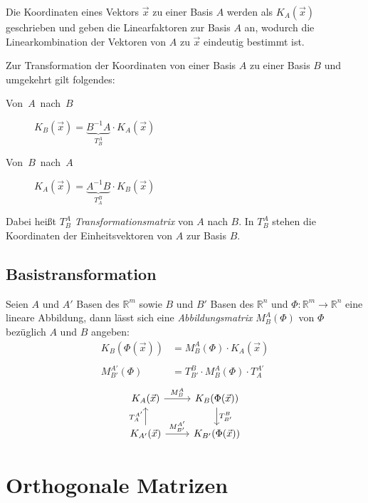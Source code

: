 Die Koordinaten eines Vektors $\vec{x}$ zu einer Basis $A$ werden als $K_A(\vec{x})$ geschrieben und geben die Linearfaktoren zur Basis $A$ an, wodurch die Linearkombination der Vektoren von $A$ zu $\vec{x}$ eindeutig bestimmt ist.

Zur Transformation der Koordinaten von einer Basis $A$ zu einer Basis $B$ und umgekehrt gilt folgendes:
\begin{description}
  \item [{Von~$A$~nach~$B$}] $K_{B}(\vec{x})=\underbrace{B^{-1}A}_{T_{B}^{A}}\cdot K_{A}(\vec{x})$
  \item [{Von~$B$~nach~$A$}] $K_{A}(\vec{x})=\underbrace{A^{-1}B}_{T_{A}^{B}}\cdot K_{B}(\vec{x})$
\end{description}
Dabei heißt $T_{B}^{A}$ \emph{Transformationsmatrix} von $A$ nach $B$. In $T_{B}^{A}$ stehen die Koordinaten der Einheitsvektoren von $A$ zur Basis $B$.


\subsection{Basistransformation}

Seien $A$ und $A'$ Basen des $\mathbb{R}^{m}$ sowie $B$ und $B'$ Basen des $\mathbb{R}^{n}$ und $\Phi:\mathbb{R}^{m}\to\mathbb{R}^{n}$ eine lineare Abbildung, dann lässt sich eine \emph{Abbildungsmatrix} $M_{B}^{A}(\Phi)$ von $\Phi$ bezüglich $A$ und $B$ angeben:
\begin{align*}
  K_B(\Phi(\vec{x})) & = M_B^A(\Phi)\cdot K_A(\vec{x})\\
  \\
  M_{B'}^{A'}(\Phi)  & = T_{B'}^B\cdot M_B^A(\Phi)\cdot T_A^{A'}
\end{align*}
\[
\begin{tikzcd}
    K_A(\vec{x}) \arrow[rightarrow]{r}{M_B^A}                                & K_B(\Phi(\vec{x})) \arrow[rightarrow]{d}{T_{B'}^B}\\
    K_{A'}(\vec{x}) \arrow[rightarrow]{u}{T_A^{A'}} \arrow[rightarrow]{r}{M_{B'}^{A'}} & K_{B'}(\Phi(\vec{x}))
\end{tikzcd}
\]



\section{\label{sec:Orthogonale-Matrizen}Orthogonale Matrizen}

